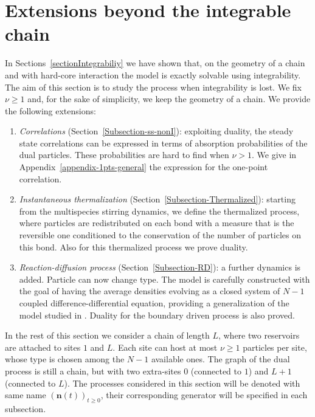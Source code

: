 \documentclass[10pt]{article}
\numberwithin{equation}{section}
\numberwithin{equation}{subsection}
\begin{document}
\section{Extensions beyond the integrable chain}
\label{sec5}
In Sections~\ref{sectionIntegrabiliy} we have shown that, on the geometry of a chain and with hard-core interaction the model  is exactly solvable using integrability.  
The aim of this section is to study the process when integrability is lost. We fix $\nu\geq 1$ and, for the sake of simplicity, we keep the geometry of a chain. We provide the following extensions: 
\begin{enumerate}
	\item \textit{Correlations} (Section~\ref{Subsection-ss-nonI}): exploiting duality, the steady state correlations can be expressed in terms of absorption probabilities of the dual particles. These probabilities are hard to find when $\nu>1$. We give 
	in Appendix~\ref{appendix-1pts-general} the expression for the one-point correlation. 
	\item \textit{Instantaneous thermalization} (Section~\ref{Subsection-Thermalized}): starting from the multispecies stirring dynamics, we define the thermalized process, where particles are redistributed on each bond with a measure that is the reversible one conditioned to the conservation of the number of particles on this bond. Also for this thermalized process we prove duality. 	
	\item \textit{Reaction-diffusion process} (Section~\ref{Subsection-RD}): a further dynamics is added. Particle can now change type. The model  is carefully constructed with the goal of having the average densities evolving as a closed system of $N-1$ coupled difference-differential equation, providing a generalization of the model studied in \cite{casini2022uphill}. Duality for the boundary driven process is also proved.
\end{enumerate}
In the rest of this section we consider a chain of length $L$, where two reservoirs are attached to sites $1$ and $L$. Each site can {\color{blue} host at most $\nu\geq 1$ particles per site, whose type is chosen among the $N-1$ available ones}. The graph of the dual process is still a chain, but with two extra-sites $0$ (connected to $1$) and $L+1$ (connected to $L$).  The processes considered in this section will be denoted with same name  $\left(\bm{n}(t)\right)_{t\geq0}$, their corresponding generator  will be specified in each subsection. 
\end{document}
